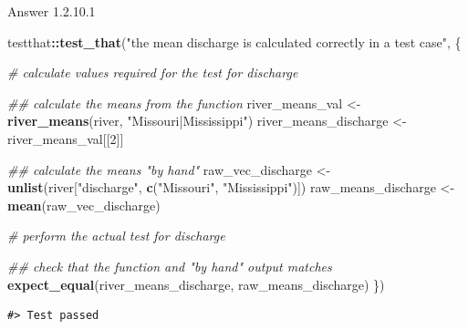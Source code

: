 \documentclass[
]{book}
\newenvironment{Shaded}{\begin{snugshade}}{\end{snugshade}}
\newcommand{\CommentTok}[1]{\textcolor[rgb]{0.56,0.35,0.01}{\textit{#1}}}
\newcommand{\DecValTok}[1]{\textcolor[rgb]{0.00,0.00,0.81}{#1}}
\newcommand{\KeywordTok}[1]{\textcolor[rgb]{0.13,0.29,0.53}{\textbf{#1}}}
\newcommand{\NormalTok}[1]{#1}
\newcommand{\OperatorTok}[1]{\textcolor[rgb]{0.81,0.36,0.00}{\textbf{#1}}}
\newcommand{\StringTok}[1]{\textcolor[rgb]{0.31,0.60,0.02}{#1}}
\begin{document}
Answer 1.2.10.1

\begin{Shaded}
\begin{Highlighting}[]
\NormalTok{testthat}\OperatorTok{::}\KeywordTok{test_that}\NormalTok{(}\StringTok{"the mean discharge is calculated correctly in a test case"}\NormalTok{, \{}
  
  \CommentTok{# calculate values required for the test for discharge}

  \CommentTok{## calculate the means from the function}
\NormalTok{  river_means_val <-}\StringTok{ }\KeywordTok{river_means}\NormalTok{(river, }\StringTok{"Missouri|Mississippi"}\NormalTok{)}
\NormalTok{  river_means_discharge <-}\StringTok{ }\NormalTok{river_means_val[[}\DecValTok{2}\NormalTok{]]}

  \CommentTok{## calculate the means "by hand"}
\NormalTok{  raw_vec_discharge <-}\StringTok{ }\KeywordTok{unlist}\NormalTok{(river[}\StringTok{"discharge"}\NormalTok{, }\KeywordTok{c}\NormalTok{(}\StringTok{"Missouri"}\NormalTok{, }\StringTok{"Mississippi"}\NormalTok{)])}
\NormalTok{  raw_means_discharge <-}\StringTok{ }\KeywordTok{mean}\NormalTok{(raw_vec_discharge)}
  
  \CommentTok{# perform the actual test for discharge}

  \CommentTok{## check that the function and "by hand" output matches}
  \KeywordTok{expect_equal}\NormalTok{(river_means_discharge, raw_means_discharge)}
\NormalTok{\})}
\end{Highlighting}
\end{Shaded}

\begin{verbatim}
#> Test passed
\end{verbatim}
\end{document}
